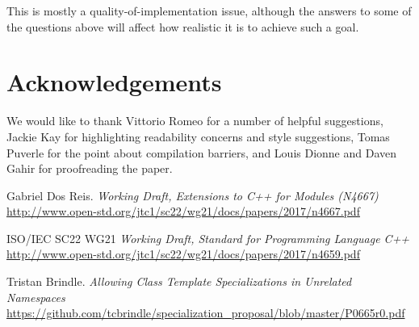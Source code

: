 \documentclass[reqno]{article}
\begin{document}
This is mostly a quality-of-implementation issue, although the answers to some
of the questions above will affect how realistic it is to achieve such a goal.


\section{Acknowledgements}

We would like to thank Vittorio Romeo for a number of helpful suggestions,
Jackie Kay for highlighting readability concerns and style suggestions, Tomas
Puverle for the point about compilation barriers, and Louis Dionne and Daven
Gahir for proofreading the paper.



\begin{thebibliography}{9}

    Gabriel Dos Reis.
        \textit{Working Draft, Extensions to C++ for Modules (N4667)}
        \url{http://www.open-std.org/jtc1/sc22/wg21/docs/papers/2017/n4667.pdf}

    ISO/IEC SC22 WG21
        \textit{Working Draft, Standard for Programming Language C++}
        \url{http://www.open-std.org/jtc1/sc22/wg21/docs/papers/2017/n4659.pdf}

    Tristan Brindle.
        \textit{Allowing Class Template Specializations in Unrelated Namespaces}
        \url{https://github.com/tcbrindle/specialization_proposal/blob/master/P0665r0.pdf}

\end{thebibliography}
\end{document}
